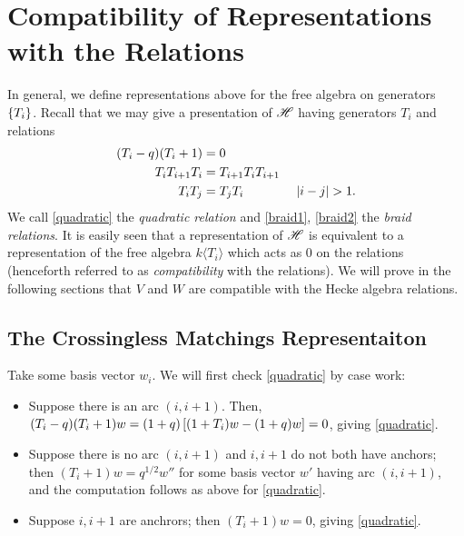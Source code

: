 \documentclass{amsart}
\begin{document}
\newpage
\appendix
\section{Compatibility of Representations with the Relations}
In general, we define representations above for the free algebra on generators $\left\{ T_i \right\}$.
Recall that we may give a presentation of $\mathscr{H}$ having generators $T_i$ and relations
\begin{align}
  (T_i - q)(T_i + 1) &= 0 \label{quadratic}\\
  T_iT_{i+1}T_i &= T_{i+1}T_iT_{i+1} \label{braid1}\\ 
  T_iT_j &= T_jT_i \hspace{40pt} \left| i - j \right| > 1. \label{braid2}
\end{align}
We call \eqref{quadratic} the \emph{quadratic relation} and \eqref{braid1}, \eqref{braid2} the \emph{braid relations}.
It is easily seen that a representation of $\mathscr{H}$ is equivalent to a representation of the free algebra $k\langle T_i \rangle$ which acts as 0 on the relations (henceforth referred to as \emph{compatibility} with the relations).
We will prove in the following sections that $V$ and $W$ are compatible with the Hecke algebra relations.

\subsection{The Crossingless Matchings Representaiton}
\label{Cross Relations}
Take some basis vector $w_i$.
We will first check \eqref{quadratic} by case work:
\begin{itemize}
  \item Suppose there is an arc $(i,i+1)$.
    Then, $(T_i-q)(T_i + 1)w = (1 + q)\left[ (1 + T_i)w - (1 + q)w \right] = 0$, giving \eqref{quadratic}.

 
  \item Suppose there is no arc $(i,i+1)$ and $i,i+1$ do not both have anchors;
    then $(T_i +  1)w = q^{1/2}w''$ for some basis vector $w'$ having arc $(i,i+1)$, and the computation follows as above for \eqref{quadratic}.
  \item Suppose $i,i+1$ are anchrors;
    then $(T_i + 1)w = 0$, giving \eqref{quadratic}.
\end{itemize}
   
\end{document}
